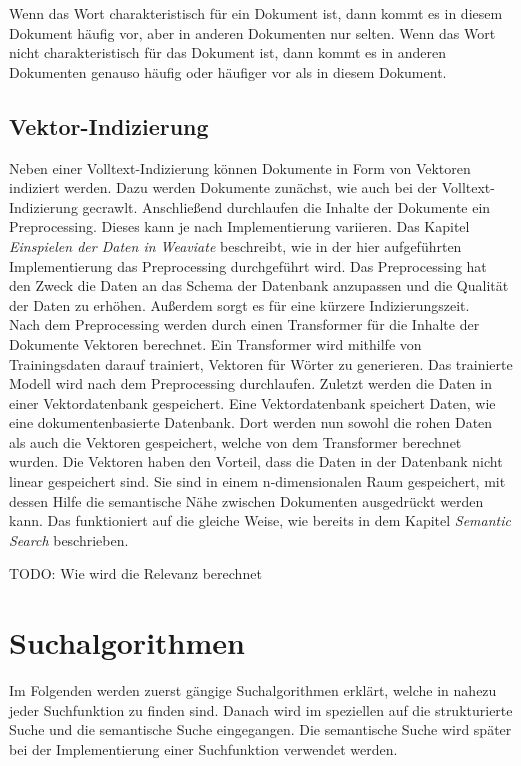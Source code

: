 Wenn das Wort charakteristisch für ein Dokument ist, dann kommt es in diesem Dokument häufig vor, aber in anderen Dokumenten nur selten.
Wenn das Wort nicht charakteristisch für das Dokument ist, dann kommt es in anderen Dokumenten genauso häufig oder häufiger vor als in diesem Dokument.\\

\subsection{Vektor-Indizierung}
Neben einer Volltext-Indizierung können Dokumente in Form von Vektoren indiziert werden.
Dazu werden Dokumente zunächst, wie auch bei der Volltext-Indizierung gecrawlt.
Anschließend durchlaufen die Inhalte der Dokumente ein Preprocessing.
Dieses kann je nach Implementierung variieren.
Das Kapitel \textit{Einspielen der Daten in Weaviate} beschreibt, wie in der hier aufgeführten Implementierung das Preprocessing durchgeführt wird.
Das Preprocessing hat den Zweck die Daten an das Schema der Datenbank anzupassen und die Qualität der Daten zu erhöhen.
Außerdem sorgt es für eine kürzere Indizierungszeit.\\

Nach dem Preprocessing werden durch einen Transformer für die Inhalte der Dokumente Vektoren berechnet.
Ein Transformer wird mithilfe von Trainingsdaten darauf trainiert, Vektoren für Wörter zu generieren.
Das trainierte Modell wird nach dem Preprocessing durchlaufen.
Zuletzt werden die Daten in einer Vektordatenbank gespeichert.
Eine Vektordatenbank speichert Daten, wie eine dokumentenbasierte Datenbank.
Dort werden nun sowohl die rohen Daten als auch die Vektoren gespeichert, welche von dem Transformer berechnet wurden.
Die Vektoren haben den Vorteil, dass die Daten in der Datenbank nicht linear gespeichert sind.
Sie sind in einem n-dimensionalen Raum gespeichert, mit dessen Hilfe die semantische Nähe zwischen Dokumenten ausgedrückt werden kann.
Das funktioniert auf die gleiche Weise, wie bereits in dem Kapitel \textit{Semantic Search} beschrieben.

TODO: Wie wird die Relevanz berechnet

\section{Suchalgorithmen}
Im Folgenden werden zuerst gängige Suchalgorithmen erklärt, welche in nahezu jeder Suchfunktion zu finden sind.
Danach wird im speziellen auf die strukturierte Suche und die semantische Suche eingegangen.
Die semantische Suche wird später bei der Implementierung einer Suchfunktion verwendet werden.

